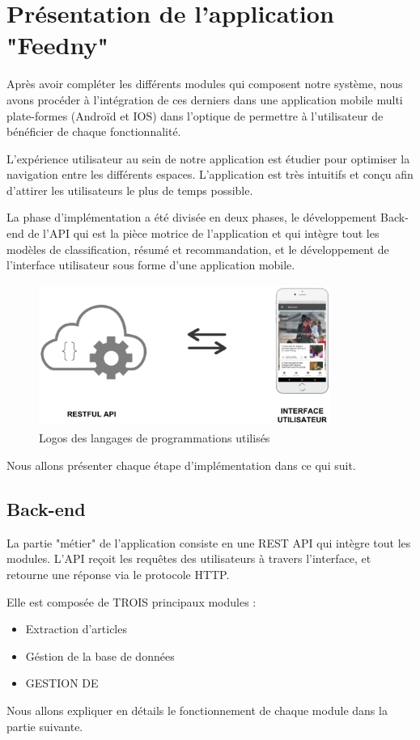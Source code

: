 
\newpage
\section{Présentation de l'application "Feedny"}
Après avoir compléter les différents modules qui composent notre système, nous avons procéder à l'intégration de ces derniers dans une application mobile multi plate-formes (Androïd et IOS) dans l'optique de permettre à l'utilisateur de bénéficier de chaque fonctionnalité.

L'expérience utilisateur au sein de notre application est étudier pour optimiser la navigation entre les différents espaces. L'application est très intuitifs et conçu afin d'attirer les utilisateurs le plus de temps possible.

La phase d'implémentation a été divisée en deux phases, le développement Back-end de l'API qui est la pièce motrice de l'application et qui intègre tout les modèles de classification, résumé et recommandation, et le développement de l'interface utilisateur sous forme d'une application mobile.

\begin{figure}[H]
    \centering
    \includegraphics[height=132pt,width=270pt]{img/chapter4/frontbackend.png}
    \caption{Logos des langages de programmations utilisés}
    \label{}
\end{figure}

Nous allons présenter chaque étape d'implémentation dans ce qui suit.

    \subsection{Back-end}
    La partie "métier" de l'application consiste en une REST API qui intègre tout les modules. L'API reçoit les requêtes des utilisateurs à travers l'interface, et retourne une réponse via le protocole HTTP.

    Elle est composée de TROIS principaux modules :
        \begin{itemize}
            \item Extraction d'articles
            \item Géstion de la base de données
            \item GESTION DE
        \end{itemize} 
    Nous allons expliquer en détails le fonctionnement de chaque module dans la partie suivante.

